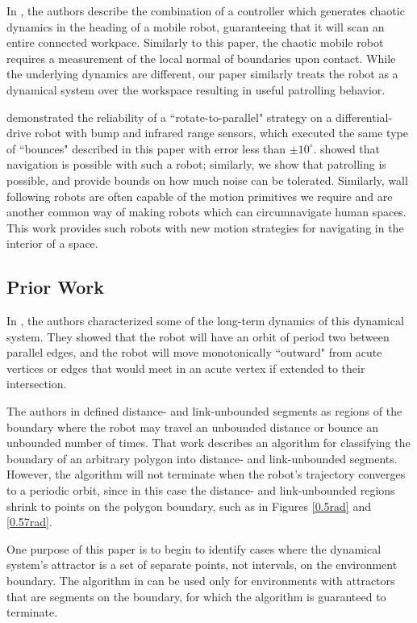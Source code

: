 \documentclass[letterpaper, 10 pt, conference]{ieeeconf}  %
\begin{document}
In \cite{nakamura2001chaotic}, the authors describe the combination of a
controller which generates chaotic dynamics in the heading of a mobile robot,
guaranteeing that it will scan an entire connected workpace.
Similarly to this paper, the chaotic mobile robot requires a measurement of
the local normal of boundaries upon contact. While the underlying dynamics are
different, our paper similarly treats the robot as a dynamical system over
the workspace resulting in useful patrolling behavior.

\cite{LewOKa13} demonstrated the reliability of a
``rotate-to-parallel" strategy on a differential-drive robot with bump and
infrared range sensors, which executed
the same type of ``bounces" described in this paper with error less than $\pm 10^{\circ}$. 
\cite{LewOKa13} showed that navigation is possible with such a robot; similarly,
we show that patrolling is possible, and provide bounds on how much noise can be
tolerated. Similarly, wall following robots \cite{Carelli2003,Lamp05} are often capable of the
motion primitives we require and are another common way of making robots which can
circumnavigate human spaces. This work provides such
robots with new motion strategies for navigating in the interior of a space.

\subsection{Prior Work}

In \cite{bounce}, the authors
characterized some of the long-term dynamics of this dynamical system. They
showed that the robot will have an orbit of period two between parallel edges,
and the robot will move monotonically ``outward" from acute vertices or edges
that would meet in an acute vertex if extended to their intersection.

The authors in \cite{bounce} defined distance- and link-unbounded
segments as regions of the boundary where the robot may
travel an unbounded distance or bounce an unbounded number of times. That work describes an algorithm for classifying the
 boundary of an arbitrary polygon into distance- and link-unbounded segments. 
 However, the algorithm will not terminate when the robot's trajectory converges 
 to a periodic orbit, since in this case the distance- and link-unbounded regions shrink to points on the polygon boundary, such as in Figures \ref{0.5rad} and \ref{0.57rad}.

One purpose of this paper is to begin to identify cases where the dynamical system's attractor is a set of separate points, not intervals, on
the environment boundary. The
algorithm in \cite{bounce} can be used only for environments with attractors that are
segments on the boundary, for which the algorithm is guaranteed to terminate.
\end{document}
